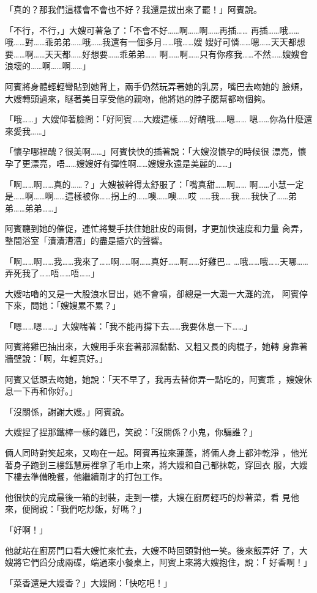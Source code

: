 「真的？那我們這樣會不會也不好？我還是拔出來了罷！」阿賓說。

「不行，不行，」大嫂可著急了：「不會不好……啊……啊……再插……
再插……哦……哦……對……乖弟弟……哦……我還有一個多月……哦……嫂
嫂好可憐……嗯……天天都想要……啊……天天都……好想要……乖弟弟……
啊……啊……只有你疼我……不然……嫂嫂會浪壞的……啊……啊……」

阿賓將身體輕輕彎貼到她背上，兩手仍然玩弄著她的乳房，嘴巴去吻她的
臉頰，大嫂轉頭過來，瞇著美目享受他的親吻，他將她的脖子腮幫都吻個夠。

「哦……」大嫂仰著臉問：「好阿賓……大嫂這樣……好醜哦……嗯……
嗯……你為什麼還來愛我……」

「懷孕哪裡醜？很美啊……」阿賓快快的插著說：「大嫂沒懷孕的時候很
漂亮，懷孕了更漂亮，唔……嫂嫂好有彈性啊……嫂嫂永遠是美麗的……」

「啊……啊……真的……？」大嫂被幹得太舒服了：「嘴真甜……啊……
啊……小慧一定是……啊……啊……這樣被你……拐上的……噢……噢……哎
……我……我……我快了……弟弟……弟弟……」

阿賓聽到她的催促，連忙將雙手扶住她肚皮的兩側，才更加快速度和力量
肏弄，整間浴室「漬漬漕漕」的盡是插穴的聲響。

「啊……啊……我……我來了……啊……啊……真好……啊……好雞巴…
…哦……哦……天哪……弄死我了……唔……唔……」

大嫂咕嚕的又是一大股浪水冒出，她不會噴，卻總是一大灘一大灘的流，
阿賓停下來，問她：「嫂嫂累不累？」

「嗯……嗯……」大嫂喘著：「我不能再撐下去……我要休息一下……」

阿賓將雞巴抽出來，大嫂用手來套著那濕黏黏、又粗又長的肉棍子，她轉
身靠著牆壁說：「啊，年輕真好。」

阿賓又低頭去吻她，她說：「天不早了，我再去替你弄一點吃的，阿賓乖
，嫂嫂休息一下再和你好。」

「沒關係，謝謝大嫂。」阿賓說。

大嫂捏了捏那鐵棒一樣的雞巴，笑說：「沒關係？小鬼，你騙誰？」

倆人同時對笑起來，又吻在一起。阿賓再拉來蓮蓬，將倆人身上都沖乾淨
，他光著身子跑到三樓鈺慧房裡拿了毛巾上來，將大嫂和自己都抹乾，穿回衣
服，大嫂下樓去準備晚餐，他繼續剛才的打包工作。

他很快的完成最後一箱的封裝，走到一樓，大嫂在廚房輕巧的炒著菜，看
見他來，便問說：「我們吃炒飯，好嗎？」

「好啊！」

他就站在廚房門口看大嫂忙來忙去，大嫂不時回頭對他一笑。後來飯弄好
了，大嫂將它們舀分成兩碟，端過來小餐桌上，阿賓上來將大嫂抱住，說：「
好香啊！」

「菜香還是大嫂香？」大嫂問：「快吃吧！」

